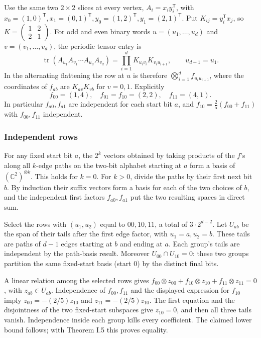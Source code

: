 \documentclass[
  11pt,
]{article}
\begin{document}
Use the same two \(2\times2\) slices at every vertex,
\(A_i=x_i y_i^{\mathsf T}\), with
\(x_0=(1,0)^{\mathsf T}, x_1=(0,1)^{\mathsf T}, y_0=(1,2)^{\mathsf T}, y_1=(2,1)^{\mathsf T}\).
Put \(K_{ij}=y_i^{\mathsf T}x_j\), so
\(K=\left(\begin{smallmatrix}1&2\\2&1\end{smallmatrix}\right)\). For odd
and even binary words \(u=(u_1,\ldots,u_d)\) and \(v=(v_1,\ldots,v_d)\),
the periodic tensor entry is \[
 \operatorname{tr}(A_{u_1}A_{v_1}\cdots A_{u_d}A_{v_d})
 =\prod_{i=1}^d K_{u_i v_i}K_{v_i u_{i+1}},
 \qquad u_{d+1}=u_1.
\] In the alternating flattening the row at \(u\) is therefore
\(\bigotimes_{i=1}^d f_{u_i u_{i+1}}\), where the coordinates of
\(f_{ab}\) are \(K_{a v}K_{v b}\) for \(v=0,1\). Explicitly \[
 f_{00}=(1,4),\quad f_{01}=f_{10}=(2,2),\quad f_{11}=(4,1).
\] In particular \(f_{a0},f_{a1}\) are independent for each start bit
\(a\), and \(f_{10}=\tfrac25(f_{00}+f_{11})\) with \(f_{00},f_{11}\)
independent.

\subsubsection{Independent rows}\label{independent-rows}

For any fixed start bit \(a\), the \(2^k\) vectors obtained by taking
products of the \(f\)'s along all \(k\)-edge paths on the two-bit
alphabet starting at \(a\) form a basis of
\((\mathbb C^2)^{\otimes k}\). This holds for \(k=0\). For \(k>0\),
divide the paths by their first next bit \(b\). By induction their
suffix vectors form a basis for each of the two choices of \(b\), and
the independent first factors \(f_{a0},f_{a1}\) put the two resulting
spaces in direct sum.

Select the rows with \((u_1,u_2)\) equal to \(00,10,11\), a total of
\(3\cdot2^{d-2}\). Let \(U_{ab}\) be the span of their tails after the
first edge factor, with \(u_1=a,u_2=b\). These tails are paths of
\(d-1\) edges starting at \(b\) and ending at \(a\). Each group's tails
are independent by the path-basis result. Moreover
\(U_{00}\cap U_{10}=0\): these two groups partition the same fixed-start
basis (start 0) by the distinct final bits.

A linear relation among the selected rows gives
\(f_{00}\otimes z_{00}+f_{10}\otimes z_{10}+f_{11}\otimes z_{11}=0\),
with \(z_{ab}\in U_{ab}\). Independence of \(f_{00},f_{11}\) and the
displayed expression for \(f_{10}\) imply \(z_{00}=-(2/5)z_{10}\) and
\(z_{11}=-(2/5)z_{10}\). The first equation and the disjointness of the
two fixed-start subspaces give \(z_{10}=0\), and then all three tails
vanish. Independence inside each group kills every coefficient. The
claimed lower bound follows; with Theorem I.5 this proves equality.
\end{document}

